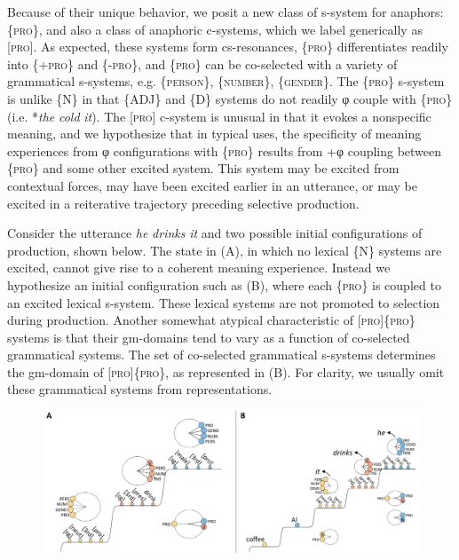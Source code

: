 Because of their unique behavior, we posit a new class of s-system for anaphors: \{\textsc{pro}\}, and also a class of anaphoric c-systems, which we label generically as [\textsc{pro}]. As expected, these systems form cs-resonances,  \{\textsc{pro}\} differentiates readily into \{+\textsc{pro}\} and \{-\textsc{pro}\}, and \{\textsc{pro}\} can be co-selected with a variety of grammatical s-systems, e.g. \{\textsc{person}\}, \{\textsc{number}\}, \{\textsc{gender}\}. The \{\textsc{pro}\} s-system is unlike \{N\} in that \{ADJ\} and \{D\} systems do not readily φ couple with \{\textsc{pro}\} (i.e. *\textit{the} \textit{cold} \textit{it}). The [\textsc{pro}] c-system is unusual in that it evokes a nonspecific meaning, and we hypothesize that in typical uses, the specificity of meaning experiences from φ configurations with \{\textsc{pro}\} results from +φ coupling between \{\textsc{pro}\} and some other excited system. This system may be excited from contextual forces, may have been excited earlier in an utterance, or may be excited in a reiterative trajectory preceding selective production. 

   Consider the utterance \textit{he} \textit{drinks} \textit{it} and two possible initial configurations of production, shown below. The state in (A), in which no lexical \{N\} systems are excited, cannot give rise to a coherent meaning experience. Instead we hypothesize an initial configuration such as (B), where each \{\textsc{pro}\} is coupled to an excited lexical s-system. These lexical systems are not promoted to selection during production. Another somewhat atypical characteristic of [\textsc{pro}]\{\textsc{pro}\} systems is that their gm-domains tend to vary as a function of co-selected grammatical systems. The set of co-selected grammatical s-systems determines the gm-domain of [\textsc{pro}]\{\textsc{pro}\}, as represented in (B). For clarity, we usually omit these grammatical systems from representations.   

  
\begin{figure}
\includegraphics[width=\textwidth]{figures/Tilsen-img152.png}
\caption{\missingcaption}
\label{fig:}
\end{figure}
 

